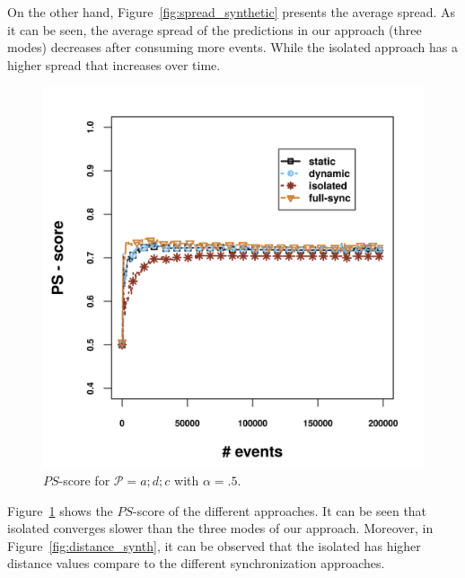 \par On the other hand, Figure~\ref{fig:spread_synthetic} presents the average spread. As it can be seen, the average spread of the predictions in our approach (three modes) decreases after consuming more events. While the isolated approach has a higher spread that increases over time. 
\begin{figure}[H]
	\centering
	\includegraphics[width=\textwidth]{chapters/figures/synthetic/new/ps_score_synthetic.png}
	
	\caption{$\mathit{PS}$-score for $\mathcal{P}=a;d;c$ with $\alpha = .5$.}
	\label{fig:ps_score_synth}
\end{figure}

\par Figure~\ref{fig:ps_score_synth} shows the $\mathit{PS}$-score of the different approaches. It can be seen that isolated converges slower than the three modes of our approach. Moreover, in Figure~\ref{fig:distance_synth}, it can be observed that the isolated has higher distance values compare to the different synchronization approaches. 


